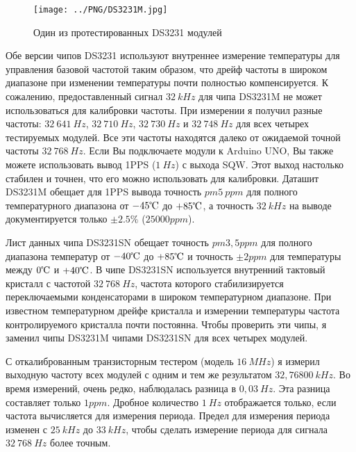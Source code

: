 \begin{figure}[H]
\centering
\texttt{[image: ../PNG/DS3231M.jpg]}
\caption{Один из протестированных DS3231 модулей}
\label{fig:DS3231M}
\end{figure}

Обе версии чипов DS3231 используют внутреннее измерение температуры для управления базовой частотой
таким образом, что дрейф частоты в широком диапазоне при изменении температуры почти полностью компенсируется.
К сожалению, предоставленный сигнал \(32~kHz\) для чипа DS3231M не может использоваться для калибровки
частоты. При измерении я получил разные частоты: \(32~641~Hz\), \(32~710~Hz\), \(32~730~Hz\) и \(32~748~Hz\) для всех 
четырех тестируемых модулей.
Все эти частоты находятся далеко от ожидаемой точной частоты \(32~768~Hz\).
Если Вы подключаете модули к Arduino UNO, Вы также можете использовать вывод 1PPS (\(1~Hz\)) с выхода SQW.
Этот выход настолько стабилен и точнен, что его можно использовать для калибровки.
Даташит DS3231M обещает для 1PPS вывода точность \(pm 5~ppm \) для полного температурного
диапазона от \(-45\celsius\) до \(+85\celsius\), а точность \(32~kHz\) на выводе
документируется только \(\pm 2.5\%\) (\(25000 ppm\)).

Лист данных чипа DS3231SN обещает точность \(pm 3,5ppm\) для полного диапазона температур
от \(-40\celsius\) до \(+85\celsius\) и точность \(\pm 2ppm\) для температуры между \(0\celsius\)
и \(+40\celsius\). В чипе DS3231SN используется внутренний тактовый кристалл с частотой \(32~768~Hz\),
частота которого стабилизируется переключаемыми конденсаторами в широком температурном диапазоне.
При известном температурном дрейфе кристалла и измерении температуры частота контролируемого кристалла почти
постоянна.
Чтобы проверить эти чипы, я заменил чипы DS3231M чипами DS3231SN для всех четырех модулей.

С откалиброванным транзисторным тестером (модель \(16~MHz\)) я измерил выходную частоту всех модулей
с одним и тем же результатом \(32,76800~kHz\). Во время измерений, очень редко, наблюдалась
разница в \(0,03~Hz\). Эта разница составляет только \(1ppm\).
Дробное количество \(1~Hz\) отображается только, если частота вычисляется для измерения периода.
Предел для измерения периода изменен с \(25~kHz\) до \(33~kHz\), чтобы сделать измерение периода
для сигнала \(32~768~Hz\) более точным.

